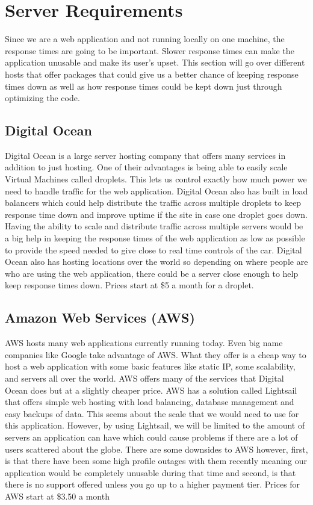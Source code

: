 \documentclass[onecolumn, draftclsnofoot,10pt, compsoc]{IEEEtran}
\begin{document}
\section{Server Requirements}
Since we are a web application and not running locally on one machine, the response times are going to be important. 
Slower response times can make the application unusable and make its user's upset.
This section will go over different hosts that offer packages that could give us a better chance of keeping response times down as well as how response times could be kept down just through optimizing the code.
\subsection{Digital Ocean}
Digital Ocean is a large server hosting company that offers many services in addition to just hosting.
One of their advantages is being able to easily scale Virtual Machines called droplets. \cite{10}
This lets us control exactly how much power we need to handle traffic for the web application.
Digital Ocean also has built in load balancers which could help distribute the traffic  across multiple droplets to keep response time down and improve uptime if the site in case one droplet goes down. \cite{10}
Having the ability to scale and distribute traffic across multiple servers would be a big help in keeping the response times of the web application as low as possible to provide the speed needed to give close to real time controls of the car.
Digital Ocean also has hosting locations over the world so depending on where people are who are using the web application, there could be a server close enough to help keep response times down. \cite{10}
Prices start at \$5 a month for a droplet. \cite{10}
\subsection{Amazon Web Services (AWS)}
AWS hosts many web applications currently running today.
Even big name companies like Google take advantage of AWS.
What they offer is a cheap way to host a web application with some basic features like static IP, some scalability, and servers all over the world. \cite{11}
AWS offers many of the services that Digital Ocean does but at a slightly cheaper price.
AWS has a solution called Lightsail that offers simple web hosting with load balancing, database management and easy backups of data. \cite{11}
This seems about the scale that we would need to use for this application.
However, by using Lightsail, we will be limited to the amount of servers an application can have which could cause problems if there are a lot of users scattered about the globe. \cite{11}
There are some downsides to AWS however, first, is that there have been some high profile outages with them recently meaning our application would be completely unusable during that time and second, is that there is no support offered unless you go up to a higher payment tier. \cite{12}
Prices for AWS start at \$3.50 a month \cite{13}
\end{document}
